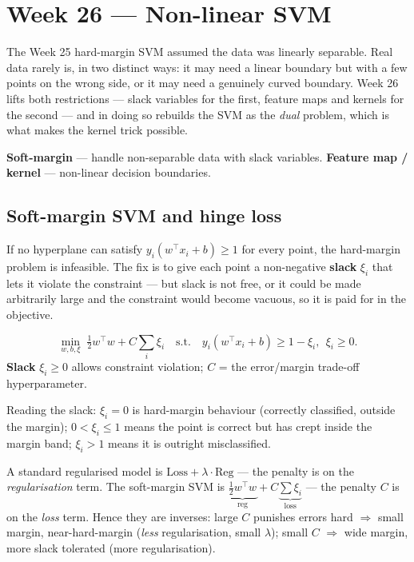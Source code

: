 \documentclass[11pt, a4paper]{article}
\newcommand{\kw}[1]{\textbf{#1}}
\begin{document}
\section{Week 26 — Non-linear SVM}

The Week 25 hard-margin SVM assumed the data was linearly separable. Real data rarely is, in two
distinct ways: it may need a linear boundary but with a few points on the wrong side, or it may need
a genuinely curved boundary. Week 26 lifts both restrictions — slack variables for the first,
feature maps and kernels for the second — and in doing so rebuilds the SVM as the \emph{dual}
problem, which is what makes the kernel trick possible.

\begin{setupbox}
\kw{Soft-margin} — handle non-separable data with slack variables. \kw{Feature map / kernel} —
non-linear decision boundaries.
\end{setupbox}

\subsection{Soft-margin SVM and hinge loss}

If no hyperplane can satisfy $y_i(w^\top x_i+b)\ge1$ for every point, the hard-margin problem is
infeasible. The fix is to give each point a non-negative \kw{slack} $\xi_i$ that lets it violate the
constraint — but slack is not free, or it could be made arbitrarily large and the constraint would
become vacuous, so it is paid for in the objective.

\begin{defbox}
\[
\min_{w,b,\xi}\;\tfrac12 w^\top w + C\sum_i\xi_i \quad\text{s.t.}\quad
y_i(w^\top x_i+b)\ge1-\xi_i,\ \ \xi_i\ge0.
\]
\kw{Slack} $\xi_i\ge0$ allows constraint violation; $C$ = the error/margin trade-off hyperparameter.
\end{defbox}

Reading the slack: $\xi_i=0$ is hard-margin behaviour (correctly classified, outside the margin);
$0<\xi_i\le1$ means the point is correct but has crept inside the margin band; $\xi_i>1$ means it is
outright misclassified.

\begin{notebox}
A standard regularised model is $\text{Loss}+\lambda\cdot\text{Reg}$ — the penalty is on the
\emph{regularisation} term. The soft-margin SVM is
$\underbrace{\tfrac12 w^\top w}_{\text{reg}}+C\underbrace{\sum\xi_i}_{\text{loss}}$ — the penalty $C$
is on the \emph{loss} term. Hence they are inverses: large $C$ punishes errors hard $\Rightarrow$
small margin, near-hard-margin (\emph{less} regularisation, small $\lambda$); small $C$ $\Rightarrow$
wide margin, more slack tolerated (more regularisation).
\end{notebox}
\end{document}
